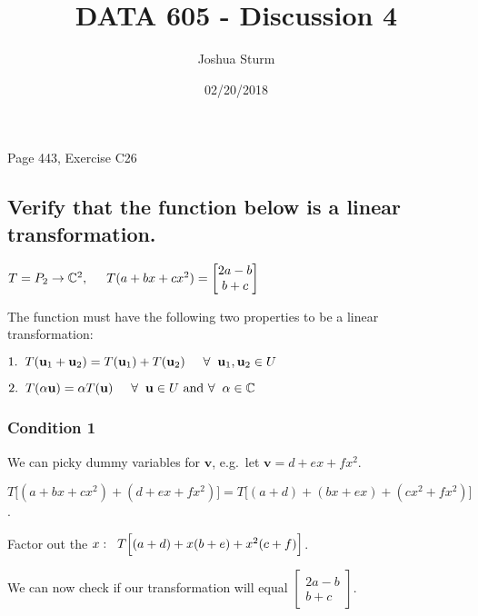 \documentclass[]{article}
\title{DATA 605 - Discussion 4}
\author{Joshua Sturm}
\date{02/20/2018}
\begin{document}
\maketitle

Page 443, Exercise C26

\subsection{Verify that the function below is a linear
transformation.}\label{verify-that-the-function-below-is-a-linear-transformation.}

\(T = P_2 \to \mathbb{C}^2, \hspace{5mm} T(a + bx + cx^2) = \begin{bmatrix}2a - b\\ b + c\end{bmatrix}\)

The function must have the following two properties to be a linear
transformation:

\(1. \hspace{2mm} T(\textbf{u}_1 + \textbf{u}_2) = T(\textbf{u}_1) + T(\textbf{u}_2) \hspace{5mm} \forall \hspace{2mm} \textbf{u}_1, \textbf{u}_2 \in U\)

\(2. \hspace{2mm} T(\alpha \textbf{u}) = \alpha T(\textbf{u}) \hspace{5mm} \forall \hspace{2mm} \textbf{u} \in U \text{ and } \forall \hspace{2mm} \alpha \in \mathbb{C}\)

\subsubsection{Condition 1}\label{condition-1}

We can picky dummy variables for \(\textbf{v}\), e.g.~let
\(\textbf{v} = d + ex + fx^2\).

\(T\Big[(a + bx + cx^2) + (d + ex + fx^2)\Big] = T\Big[(a + d) + (bx + ex) + (cx^2 + fx^2)\Big]\).

Factor out the
\(x: \hspace{2mm} T\Big[(a + d) + x(b + e) + x^2(c + f)\Big]\).

We can now check if our transformation will equal
\(\begin{bmatrix}2a - b\\ b + c\end{bmatrix}\).
\end{document}
